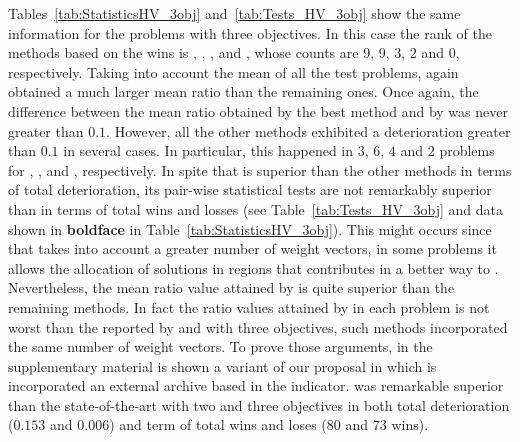 Tables~\ref{tab:StatisticsHV_3obj} and~\ref{tab:Tests_HV_3obj} show the same information for the problems with three objectives.
%
In this case the rank of the methods based on the wins is \VSDMOEAD{}, \RMOEA{}, \MOEADDE{}, \NSGAIII{} and \NSGAII{}, whose counts are $9$, $9$, $3$, $2$ and $0$, respectively.
%
%
Taking into account the mean of all the test problems, \VSDMOEAD{} again obtained a much larger mean \HV{} ratio than the remaining ones.
%
Once again, the difference between the mean \HV{} ratio obtained by the best method and by \VSDMOEAD{} was never greater than $0.1$.
%
However, all the other methods exhibited a deterioration greater than $0.1$ in several cases.
%
In particular, this happened in $3$, $6$, $4$ and $2$ problems for \RMOEA{}, \NSGAII{}, \NSGAIII{} and \MOEADDE{}, respectively.
%
In spite that \VSDMOEAD{} is superior than the other methods in terms of total deterioration, its pair-wise statistical tests are not remarkably superior than \RMOEA{} in terms of total wins and losses (see Table~\ref{tab:Tests_HV_3obj} and data shown in {\bf boldface} in Table~\ref{tab:StatisticsHV_3obj}).
%
This might occurs since that \RMOEA{} takes into account a greater number of weight vectors, in some problems it allows the allocation of solutions in regions that contributes in a better way to \HV{}.
%
Nevertheless, the mean \HV{} ratio value attained by \VSDMOEAD{} is quite superior than the remaining methods.
%
In fact the \HV{} ratio values attained by \VSDMOEAD{} in each problem is not worst than the reported by \MOEADDE{} and \NSGAIII{} with three objectives, such methods incorporated the same number of weight vectors.
%
To prove those arguments, in the supplementary material is shown a variant of our proposal \AVSDMOEAD{} in which is incorporated an external archive based in the \RR{} indicator.
%
\AVSDMOEAD{} was remarkable superior than the state-of-the-art \MOEAS{} with two and three objectives in both total deterioration ($0.153$ and $0.006$) and term of total wins and loses ($80$ and $73$ wins).
%
%










